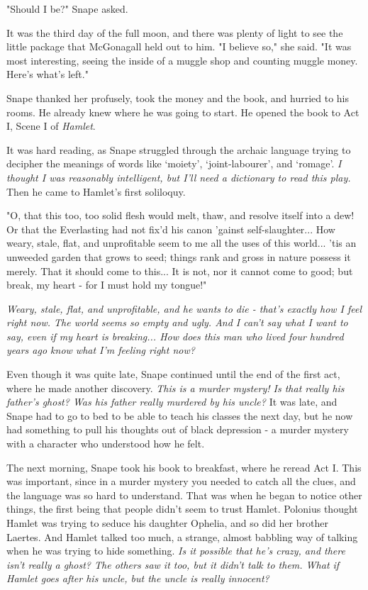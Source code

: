 "Should I be?" Snape asked.

It was the third day of the full moon, and there was plenty of light to see the little package that McGonagall held out to him. "I believe so," she said. "It was most interesting, seeing the inside of a muggle shop and counting muggle money. Here's what's left."

Snape thanked her profusely, took the money and the book, and hurried to his rooms. He already knew where he was going to start. He opened the book to Act I, Scene I of \emph{Hamlet}.

It was hard reading, as Snape struggled through the archaic language trying to decipher the meanings of words like `moiety', `joint-labourer', and `romage'. \emph{I thought I was reasonably intelligent, but I'll need a dictionary to read this play.} Then he came to Hamlet's first soliloquy.

"O, that this too, too solid flesh would melt, thaw, and resolve itself into a dew! Or that the Everlasting had not fix'd his canon 'gainst self-slaughter... How weary, stale, flat, and unprofitable seem to me all the uses of this world... 'tis an unweeded garden that grows to seed; things rank and gross in nature possess it merely. That it should come to this... It is not, nor it cannot come to good; but break, my heart - for I must hold my tongue!"

\emph{Weary, stale, flat, and unprofitable, and he wants to die - that's exactly how I feel right now. The world seems so empty and ugly. And I can't say what I want to say, even if my heart is breaking... How does this man who lived four hundred years ago know what I'm feeling right now?}

Even though it was quite late, Snape continued until the end of the first act, where he made another discovery. \emph{This is a murder mystery! Is that really his father's ghost? Was his father really murdered by his uncle?} It was late, and Snape had to go to bed to be able to teach his classes the next day, but he now had something to pull his thoughts out of black depression - a murder mystery with a character who understood how he felt.

The next morning, Snape took his book to breakfast, where he reread Act I. This was important, since in a murder mystery you needed to catch all the clues, and the language was so hard to understand. That was when he began to notice other things, the first being that people didn't seem to trust Hamlet. Polonius thought Hamlet was trying to seduce his daughter Ophelia, and so did her brother Laertes. And Hamlet talked too much, a strange, almost babbling way of talking when he was trying to hide something. \emph{Is it possible that he's crazy, and there isn't really a ghost? The others saw it too, but it didn't talk to them. What if Hamlet goes after his uncle, but the uncle is really innocent?}

